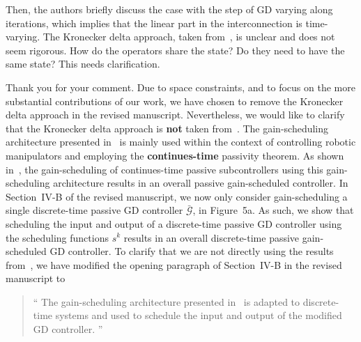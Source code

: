 \begin{rebuttal}[pending]
    {%
        Then, the authors briefly discuss the case with the step of GD varying along iterations, which implies that the linear part in the interconnection is time-varying. The Kronecker delta approach, taken from~\cite{Damaren_spr_gain_scheduling_1996}, is unclear and does not seem rigorous. How do the operators share the state? Do they need to have the same state? This needs clarification. 
    }%
    {%
        Thank you for your comment. Due to space constraints, and to focus on the more substantial contributions of our work, we have chosen to remove the Kronecker delta approach in the revised manuscript. Nevertheless, we would like to clarify that the Kronecker delta approach is \textbf{not} taken from~\cite{Damaren_spr_gain_scheduling_1996}. The gain-scheduling architecture presented in~\cite{Damaren_spr_gain_scheduling_1996} is mainly used within the context of controlling robotic manipulators and employing the \textbf{continues-time} passivity theorem. As shown in~\cite{Damaren_spr_gain_scheduling_1996}, the gain-scheduling of continues-time passive subcontrollers using this gain-scheduling architecture results in an overall passive gain-scheduled controller. In \mbox{Section~IV-B} of the revised manuscript, we now only consider gain-scheduling a single discrete-time passive GD controller \(\bar{\bm{\mathcal{G}}}\), in Figure~5a. As such, we show that scheduling the input and output of a discrete-time passive GD controller using the scheduling functions \(s^k\) results in an overall discrete-time passive gain-scheduled GD controller. To clarify that we are not directly using the results from~\cite{Damaren_spr_gain_scheduling_1996}, we have modified the opening paragraph of Section~IV-B in the revised manuscript to
        \begin{quote}\enquote{%
            The gain-scheduling architecture presented in~\cite{Damaren_spr_gain_scheduling_1996} is adapted to discrete-time systems and used to schedule the input and output of the modified GD controller.%
            }%
        \end{quote}
    }%
\end{rebuttal}
